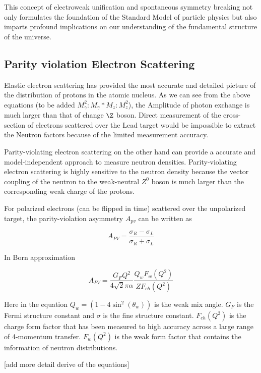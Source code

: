 This concept of electroweak unification and spontaneous symmetry breaking not only formulates the foundation of the Standard Model of particle physics but also imparts profound implications on our understanding of the fundamental structure of the universe. 


\subsection{Parity violation Electron Scattering}

Elastic electron scattering has provided the most accurate and detailed picture of the distribution of protons in the atomic nucleus. As we can see from the above equations (to be added  $M_\gamma^2:M_\gamma*M_z: M_z^2$), the Amplitude of photon exchange is much larger than that of change $\Z$ boson. Direct measurement of the cross-section of electrons scattered over the Lead target would be impossible to extract the Neutron factors because of the limited measurement accuracy.


Parity-violating electron scattering on the other hand can provide a accurate and model-independent approach to measure neutron densities. Parity-violating electron scattering is highly sensitive to the neutron density because the vector coupling of the neutron to the weak-neutral $Z^0$ boson is much larger than the corresponding weak charge of the protons. 

For polarized electrons (can be flipped in time) scattered over the unpolarized target, the parity-violation asymmetry $A_{pv}$ can be written as

\begin{equation}
    A_{PV} = \frac{\sigma_R - \sigma_L}{\sigma_R + \sigma_L}
\end{equation}

In Born approximation

\begin{equation}
    A_{PV} = \frac{G_FQ^2}{4\sqrt{2}\pi\alpha}\frac{Q_wF_w(Q^2)}{ZF_{ch}(Q^2)}
\end{equation}

Here in the equation $Q_w = (1-4\sin^2(\theta_w))$ is the weak mix angle. $G_F$ is the Fermi structure constant and $\sigma$ is the fine structure constant. $F_{ch}(Q^2)$ is the charge form factor that has been measured to high accuracy across a large range of 4-momentum transfer. $F_w(Q^2)$ is the weak form factor that contains the information of neutron distributions.

[add more detail derive of the equations]


